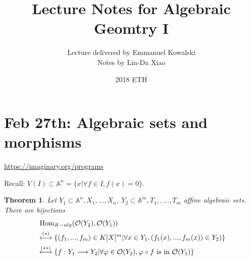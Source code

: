\documentclass[11pt]{article}
\title{\bf Lecture Notes for Algebraic Geomtry I}
\author{Lecture delivered by Emmanuel Kowalski\\
	Notes by Lin-Da Xiao}
\date{2018 ETH} %
\newtheorem{thm}{Theorem}[section]
\renewcommand{\hom}{\text{ Hom}}
\newcommand{\affn}{\mathbb A}
\newcommand{\calo}{{\cal O}}
\newcommand{\lrta}{\longrightarrow}
\newcommand{\llrta}{\longleftrightarrow}
\begin{document}
	\maketitle
	\tableofcontents
	\newpage
	\section{Feb 27th: Algebraic sets and morphisms}
	\href{https://imaginary.org/programs}{https://imaginary.org/programs}
	
	Recall: $V(I)\subset \affn^n =\{x|\forall f\in I, f(x)=0\}$.
	
	\begin{thm}\label{thm:equivalence_of_categories_algebraic_sets_K_algebras}
		Let $Y_1\subset \affn^n, X_1,...,X_n$, $Y_2\subset \affn^m, T_1,,..., T_m$ affine algebraic sets. There are bijections 
		$$
		\begin{aligned}
		&\hom_{K-alg}(\calo(Y_2),\calo(Y_1))
		\\
		&\overset{(*)}{\llrta}\{(f_1,...,f_m)\in K[X]^m|\forall x\in Y_1,(f_1(x),...,f_m(x))\in Y_2) \}\\
		&\overset{(**)}{\llrta} \{f:Y_1\lrta Y_2|\forall \varphi\in \calo(Y_2),\varphi\circ f\text{ is  in }  \calo(Y_1)\}
		\end{aligned}
		$$
	\end{thm}
\end{document}
